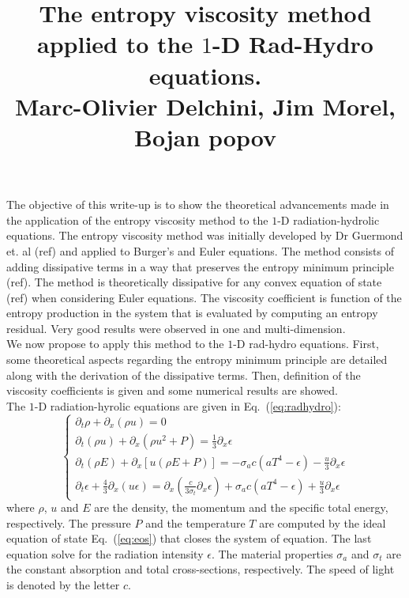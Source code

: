 \documentclass{article}
\title{The entropy viscosity  method applied to the $1$-D Rad-Hydro equations. \\
Marc-Olivier Delchini, Jim Morel, Bojan popov}
\newcommand{\eqt}[1]{Eq.~(\ref{#1})}                     %
\begin{document}
\maketitle
The objective of this write-up is to show the theoretical advancements made in the application of the entropy viscosity method to the $1$-D  radiation-hydrolic equations. The entropy viscosity method was initially developed by Dr Guermond et. al (ref) and applied to Burger's and Euler equations. The method consists of adding dissipative terms in a way that preserves the entropy minimum principle (ref). The method is theoretically dissipative for any convex equation of state (ref) when considering Euler equations. The viscosity coefficient is function of the entropy production in the system that is evaluated by computing an entropy residual. Very good results were observed in one and multi-dimension. \\ 
We now propose to apply this method to the $1$-D rad-hydro equations. First, some theoretical aspects regarding the entropy minimum principle are detailed along with the derivation of the dissipative terms. Then, definition of the viscosity coefficients is given and some numerical results are showed. \\
The $1$-D radiation-hyrolic equations are given in \eqt{eq:radhydro}: 
\begin{equation}
\label{eq:radhydro}
\left\{
\begin{array}{llll}
\partial_t \rho + \partial_x \left( \rho u \right) = 0\\
\partial_t \left( \rho u \right) + \partial_x \left( \rho u^2 + P \right) = \frac{1}{3} \partial_x \epsilon \\
\partial_t \left( \rho E \right) + \partial_x \left[ u \left(\rho E + P \right) \right] = - \sigma_a c \left( a T^4 - \epsilon \right) - \frac{u}{3} \partial_x \epsilon \\
\partial_t \epsilon + \frac{4}{3} \partial_x \left( u \epsilon  \right) = \partial_x \left( \frac{c}{3 \sigma_t} \partial_x \epsilon \right) + \sigma_a c \left( a T^4 - \epsilon \right) + \frac{u}{3} \partial_x \epsilon 
\end{array}
\right.
\end{equation}
where $\rho$, $u$ and $E$ are the density, the momentum and the specific total energy, respectively. The pressure $P$ and the temperature $T$ are computed by the ideal equation of state \eqt{eq:eos} that closes the system of equation. The last equation solve for the radiation intensity $\epsilon$. The material properties $\sigma_a$ and $\sigma_t$ are the constant absorption and total cross-sections, respectively. The speed of light is denoted by the letter $c$.
\end{document}
